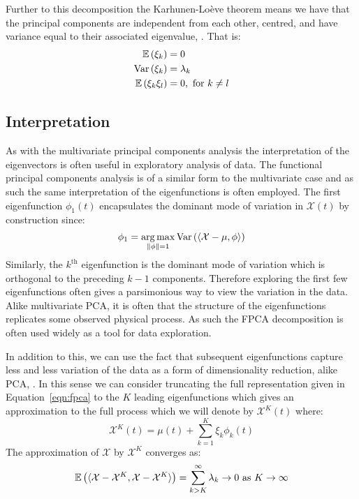 Further to this decomposition the Karhunen-Lo\`{e}ve theorem means we have that the principal components are independent from each other, centred, and have variance equal to their associated eigenvalue, \citep{karhunen_zur_1946, loeve_fonctions_1946}.
That is:
\begin{align}
	\operatorname{\mathbb{E}}\left(\xi_k\right) &= 0 \\
	\text{Var}\left(\xi_k\right) &= \lambda_k \\
	\operatorname{\mathbb{E}}\left(\xi_k \xi_l\right) &= 0,~\text{for}~ k \ne l \label{eqn:principal_comp_uncorr}
\end{align}

\subsection{Interpretation}
As with the multivariate principal components analysis the interpretation of the eigenvectors is often useful in exploratory analysis of data.
The functional principal components analysis is of a similar form to the multivariate case and as such the same interpretation of the eigenfunctions is often employed.
The first eigenfunction $\phi_1(t)$ encapsulates the dominant mode of variation in $\mathcal{X}(t)$ by construction since:
\begin{equation}\label{eqn:first_comp}
	\phi_1 = \operatorname*{arg\,max}_{\lVert \phi \rVert=1} \text{Var}\left( \langle  \mathcal{X} - \mu, \phi \rangle  \right)
\end{equation}
Similarly, the $k^\text{th}$ eigenfunction is the dominant mode of variation which is orthogonal to the preceding $k-1$ components.
Therefore exploring the first few eigenfunctions often gives a parsimonious way to view the variation in the data.
Alike multivariate PCA, it is often that the structure of the eigenfunctions replicates some observed physical process.
As such the FPCA decomposition is often used widely as a tool for data exploration. 

In addition to this, we can use the fact that subsequent eigenfunctions capture less and less variation of the data as a form of dimensionality reduction, alike PCA, \citep{wold_principal_1987}.
In this sense we can consider truncating the full representation given in Equation~\eqref{eqn:fpca} to the $K$ leading eigenfunctions which gives an approximation to the full process which we will denote by $\mathcal{X}^K(t)$ where:
\begin{equation}\label{eqn:fpca_trun}
	\mathcal{X}^K(t)  =   \mu(t) + \sum_{k=1}^{K}\xi_k \phi_k(t)
\end{equation}
The approximation of $\mathcal{X}$ by $\mathcal{X}^K$ converges as:
\begin{equation}\label{eqn:fpca_trun_conv}
	\operatorname{\mathbb{E}} \left( \langle  \mathcal{X} - \mathcal{X}^K, \mathcal{X} - \mathcal{X}^K \rangle \right)  =   \sum_{k > K}^{\infty} \lambda_k \to 0~\text{as}~K \to \infty
\end{equation}


